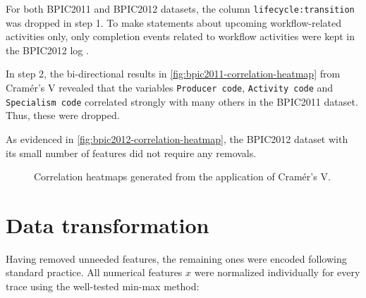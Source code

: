 For both BPIC2011 and BPIC2012 datasets, the column \texttt{lifecycle:transition} was dropped in step 1. To make statements about upcoming workflow-related activities only, only completion events related to workflow activities were kept in the BPIC2012 log \cite{evermann2016}.

In step 2, the bi-directional results in \autoref{fig:bpic2011-correlation-heatmap} from Cramér's V revealed that the variables \texttt{Producer code}, \texttt{Activity code} and \texttt{Specialism code} correlated strongly with many others in the BPIC2011 dataset. Thus, these were dropped.

As evidenced in \autoref{fig:bpic2012-correlation-heatmap}, the BPIC2012 dataset with its small number of features did not require any removals.

\begin{figure}
\centering
{}
\qquad
{}
\caption{Correlation heatmaps generated from the application of Cramér's V.}
\end{figure}

\section{Data transformation}
Having removed unneeded features, the remaining ones were encoded following standard practice. All numerical features $x$ were normalized individually for every trace using the well-tested min-max method:

